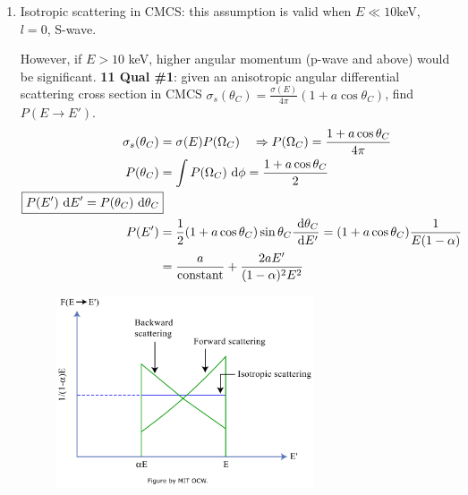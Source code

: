 \documentclass{school-22.101-notes}
\begin{document}
\begin{enumerate}
\begin{enumerate}
\item Isotropic scattering in CMCS: this assumption is valid when $E \ll 10 $keV, $l=0$, S-wave. 

However, if $E > 10$ keV, higher angular momentum (p-wave and above) would be significant. 
\textbf{11 Qual \#1}: given an anisotropic angular differential scattering cross section in CMCS $\sigma_s (\theta_C) = \frac{\sigma (E)}{4 \pi} ( 1 + a \cos \theta_C)$, find $P(E \to E')$. 
\begin{align}
\sigma_s(\theta_C) &= \sigma(E) P(\Omega_C) \fsp \fsp \fsp \Rightarrow P(\Omega_C) = \frac{1 + a \cos \theta_C}{4 \pi} \\
 P(\theta_C) &= \int P(\Omega_C) \dphi =  \frac{1 + a \cos \theta_C}{2} \\
\Aboxed{ P(E') \dE' = P(\theta_C) \dtheta_C } \\
P(E^{\prime}) &= \frac{1}{2} (1 + a \cos \theta_C) \sin \theta_C \frac{\dtheta_C}{\dE^{\prime}} = (1 + a \cos \theta_C) \frac{1}{E(1-\alpha)} \\
&= \frac{a}{\mbox{constant}} + \frac{2 a E^{\prime}}{(1-\alpha)^2 E^2}
\end{align}
\begin{figure}
    \centering
    \includegraphics[width=3in]{images/ni/p-wave-approx.png}
\end{figure}
\end{enumerate}



\end{enumerate}
\end{document}
